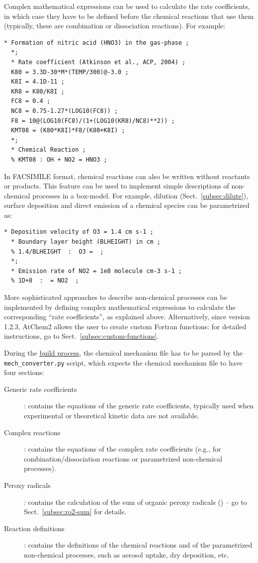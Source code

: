 Complex mathematical expressions can be used to calculate the rate coefficients, in which case
they have to be defined before the chemical reactions that use them (typically, these are
combination or dissociation reactions). For example:

\begin{Verbatim}[fontsize=\small]
  * Formation of nitric acid (HNO3) in the gas-phase ;
  *;
  * Rate coefficient (Atkinson et al., ACP, 2004) ;
  K80 = 3.3D-30*M*(TEMP/300)@-3.0 ;
  K8I = 4.1D-11 ;
  KR8 = K80/K8I ;
  FC8 = 0.4 ;
  NC8 = 0.75-1.27*(LOG10(FC8)) ;
  F8 = 10@(LOG10(FC8)/(1+(LOG10(KR8)/NC8)**2)) ;
  KMT08 = (K80*K8I)*F8/(K80+K8I) ;
  *;
  * Chemical Reaction ;
  % KMT08 : OH + NO2 = HNO3 ;
\end{Verbatim}

In FACSIMILE format, chemical reactions can also be written without reactants or products. This
feature can be used to implement simple descriptions of non-chemical processes in a
box-model. For example, dilution (Sect.~\ref{subsec:dilute}), surface deposition and direct
emission of a chemical species can be parametrized as:

\begin{Verbatim}[fontsize=\small]
  * Deposition velocity of O3 = 1.4 cm s-1 ;
  * Boundary layer height (BLHEIGHT) in cm ;
  % 1.4/BLHEIGHT  :  O3 =  ;
  *;
  * Emission rate of NO2 = 1e8 molecule cm-3 s-1 ;
  % 1D+8  :  = NO2  ;
\end{Verbatim}

More sophisticated approaches to describe non-chemical processes can be implemented by defining
complex mathematical expressions to calculate the corresponding ``rate coefficients'', as
explained above. Alternatively, since version 1.2.3, AtChem2 allows the user to create custom
Fortran functions: for detailed instructions, go to Sect.~\ref{subsec:custom-functions}.

During the \hyperref[subsec:build-process]{build process}, the chemical mechanism file has to
be parsed by the \texttt{mech\_converter.py} script, which expects the chemical mechanism file
to have four sections:

\begin{description}
\item[Generic rate coefficients]: contains the equations of the generic rate coefficients,
  typically used when experimental or theoretical kinetic data are not available.
\item[Complex reactions]: contains the equations of the complex rate coefficients (e.g., for
  combination/dissociation reactions or parametrized non-chemical processes).
\item[Peroxy radicals]: contains the calculation of the sum of organic peroxy radicals
  () -- go to Sect.~\ref{subsec:ro2-sum} for details.
\item[Reaction definitions]: contains the definitions of the chemical reactions and of the
  parametrized non-chemical processes, such as aerosol uptake, dry deposition, etc.
\end{description}

